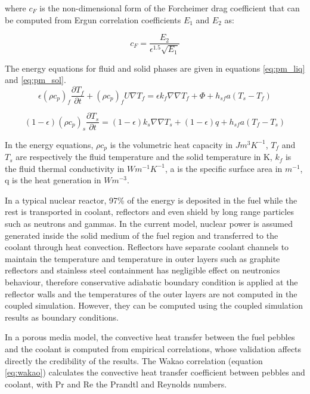 \documentclass{elsarticle}
\begin{document}
where $c_F$ is the non-dimensional form of the Forcheimer drag coefficient that can be computed from Ergun correlation coefficients $E_1$ and $E_2$ as:

\begin{equation}
    c_F = \frac{E_2}{\epsilon^{1.5}\sqrt{E_1}}
\end{equation}



The energy equations for fluid and solid phases are given in equations \ref{eq:pm_liq} and \ref{eq:pm_sol}.
\begin{equation}
  \epsilon(\rho c_p)_f \frac{\partial T_f}{\partial t} + (\rho c_p)_f U\nabla T_f = \epsilon k_f \nabla\nabla T_f + \Phi + h_{sf}a(T_s - T_f)
  \label{eq:pm_liq}
\end{equation}

\begin{equation}
  (1-\epsilon)(\rho c_p)_s \frac{\partial T_s}{\partial t} =(1-\epsilon)k_s \nabla\nabla T_s + (1-\epsilon)q + h_{sf}a(T_f - T_s)
  \label{eq:pm_sol}
\end{equation}

In the energy equations, $\rho c_p$ is the volumetric heat capacity in $Jm^3K^{-1}$, $T_f$ and $T_s$ are respectively the fluid temperature and the solid temperature in K, $k_f$ is the fluid thermal conductivity in $Wm^{-1}K^{-1}$, a is the specific surface area in $m^{-1}$, q is the heat generation in $Wm^{-3}$.

In a typical nuclear reactor, 97\% of the energy is deposited in the fuel while the rest is transported in coolant, reflectors and even shield by long range particles such as neutrons and gammas. 
In the current model, nuclear power is assumed generated inside the solid medium of the fuel region and transferred to the coolant through heat convection. Reflectors have separate coolant channels to maintain the temperature and temperature in outer layers such as graphite reflectors and stainless steel containment has negligible effect on neutronics behaviour, therefore conservative adiabatic boundary condition is applied at the reflector walls and the temperatures of the outer layers are not computed in the coupled simulation. However, they can be computed using the coupled simulation results as boundary conditions.

In a porous media model, the convective heat transfer between the fuel pebbles and the coolant is computed from empirical correlations, whose validation affects directly the credibility of the results. The Wakao correlation (equation \ref{eq:wakao}) \cite{Wakao1979} calculates the convective heat transfer coefficient between pebbles and coolant, with Pr and Re the Prandtl and Reynolds numbers.
\end{document}
